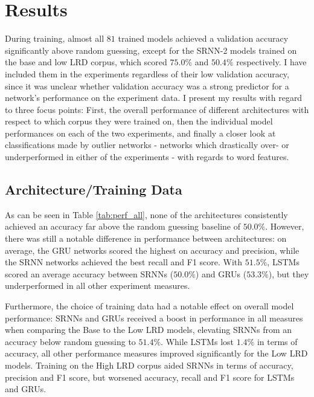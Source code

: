 \section{Results}\label{ch:results}
During training, almost all $81$ trained models achieved a validation accuracy significantly above random guessing, except for the SRNN-2 models trained on the base and low LRD corpus, which scored $75.0\%$ and $50.4\%$ respectively. I have included them in the experiments regardless of their low validation accuracy, since it was unclear whether validation accuracy was a strong predictor for a network's performance on the experiment data. I present my results with regard to three focus points: First, the overall performance of different architectures with respect to which corpus they were trained on, then the individual model performances on each of the two experiments, and finally a closer look at classifications made by outlier networks - networks which drastically over- or underperformed in either of the experiments - with regards to word features.

\subsection{Architecture/Training Data}

As can be seen in Table \ref{tab:perf_all}, none of the architectures consistently achieved an accuracy far above the random guessing baseline of $50.0\%$. However, there was still a notable difference in performance between architectures: on average, the GRU networks scored the highest on accuracy and precision, while the SRNN networks achieved the best recall and F1 score. With $51.5\%$, LSTMs scored an average accuracy between SRNNs ($50.0\%$) and GRUs ($53.3\%$), but they underperformed in all other experiment measures.

Furthermore, the choice of training data had a notable effect on overall model performance: SRNNs and GRUs received a boost in performance in all measures when comparing the Base to the Low LRD models, elevating SRNNs from an accuracy below random guessing to $51.4\%$. While LSTMs lost $1.4\%$ in terms of accuracy, all other performance measures improved significantly for the Low LRD models. Training on the High LRD corpus aided SRNNs in terms of accuracy, precision and F1 score, but worsened accuracy, recall and F1 score for LSTMs and GRUs.


